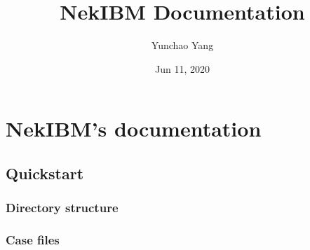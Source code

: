 \documentclass[letterpaper,10pt,english]{sphinxmanual}
\title{NekIBM Documentation}
\date{Jun 11, 2020}
\author{Yunchao Yang}
\begin{document}
\maketitle
\sphinxtableofcontents
{}\label{\detokenize{index::doc}}



\chapter{NekIBM’s documentation}
\label{\detokenize{index:a-parallel-immersed-boundary-implementation-based-on-nek5000-cmtenk}}\label{\detokenize{index:nekibm-s-documentation}}

\section{Quickstart}
\label{\detokenize{quickstart::doc}}\label{\detokenize{quickstart:qstart}}\label{\detokenize{quickstart:quickstart}}

\subsection{Directory structure}
\label{\detokenize{quickstart:directory-structure}}

\subsection{Case files}
\label{\detokenize{quickstart:case-files}}
\end{document}

